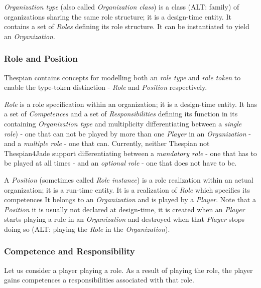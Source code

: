\textit{Organization type} (also called \textit{Organization class}) is a class (ALT: family) of organizations sharing the same role structure; it is a design-time entity.
It contains a set of \textit{Roles} defining its role structure.
It can be instantiated to yield an \textit{Organization}. 

\subsubsection*{Role and Position}

Thespian contains concepts for modelling both an \textit{role type} and \textit{role token} to enable the type-token distinction - \textit{Role} and \textit{Position} respectively.

\textit{Role} is a role specification within an organization; it is a design-time entity.
It has a set of \textit{Competences} and a set of \textit{Responsibilities} defining its function in its containing \textit{Organization type} and multiplicity differentiating between a \textit{single role}) - one that can not be played by more than one \textit{Player} in an \textit{Organization} - and a \textit{multiple role} - one that can.
Currently, neither Thespian not Thespian4Jade support differentiating between a \textit{mandatory role} - one that has to be played at all times - and an \textit{optional role} - one that does not have to be.

A \textit{Position} (sometimes called \textit{Role instance}) is a role realization within an actual organization; it is a run-time entity.
It is a realization of \textit{Role} which specifies its competences
It belongs to an \textit{Organization} and is played by a \textit{Player}.
Note that a \textit{Position} it is usually not declared at design-time, it is created when an \textit{Player} starts playing a rule in an \textit{Organization} and destroyed when that \textit{Player} stops doing so (ALT: playing the \textit{Role} in the \textit{Organization}).

\subsubsection*{Competence and Responsibility}

Let us consider a player playing a role.
As a result of playing the role, the player gains competences a responsibilities associated with that role.

